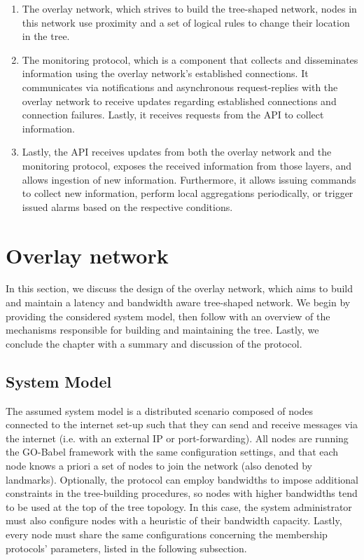 \begin{enumerate}
    \item The overlay network, which strives to build the tree-shaped network, nodes in this network use proximity and a set of logical rules to change their location in the tree.

    \item The monitoring protocol, which is a component that collects and disseminates information using the overlay network's established connections. It communicates via notifications and asynchronous request-replies with the overlay network to receive updates regarding established connections and connection failures. Lastly, it receives requests from the API to collect information.

    \item Lastly, the API receives updates from both the overlay network and the monitoring protocol, exposes the received information from those layers, and allows ingestion of new information. Furthermore, it allows issuing commands to collect new information, perform local aggregations periodically, or trigger issued alarms based on the respective conditions.
\end{enumerate}

\section{Overlay network}

In this section, we discuss the design of the overlay network, which aims to build and maintain a latency and bandwidth aware tree-shaped network. We begin by providing the considered system model, then follow with an overview of the mechanisms responsible for building and maintaining the tree. Lastly, we conclude the chapter with a summary and discussion of the protocol.

\subsection{System Model}

The assumed system model is a distributed scenario composed of nodes connected to the internet set-up such that they can send and receive messages via the internet (i.e. with an external IP or port-forwarding). All nodes are running the GO-Babel framework with the same configuration settings, and that each node knows a priori a set of nodes to join the network (also denoted by landmarks). Optionally, the protocol can employ bandwidths to impose additional constraints in the tree-building procedures, so nodes with higher bandwidths tend to be used at the top of the tree topology. In this case, the system administrator must also configure nodes with a heuristic of their bandwidth capacity. Lastly, every node must share the same configurations concerning the membership protocols' parameters, listed in the following subsection.  

